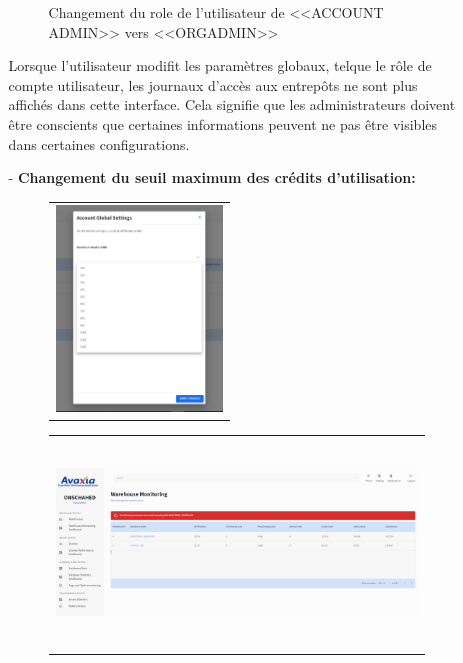 \begin{itemize}
\begin{enumerate}
\begin{figure}[H]
\begin{tabular}[b]{c}
                        \end{tabular}
                        \caption{Changement du role de l'utilisateur de <<ACCOUNT ADMIN>> vers <<ORGADMIN>>                    }
                    \end{figure}
                    \par Lorsque l'utilisateur  modifit les paramètres globaux, telque le rôle de compte utilisateur, les journaux d'accès aux entrepôts ne sont plus affichés dans cette interface. Cela signifie que les administrateurs doivent être conscients que certaines informations peuvent ne pas être visibles dans certaines configurations.
                    \item[-] \textbf{Changement du seuil maximum des crédits d'utilisation:}
                    \begin{figure}[H]
                        \centering
                        \begin{tabular}[b]{c}
                        \includegraphics[width=.2\linewidth, height=5.5cm]{img/captures/warehouse/global_set_credits.png} \\
                        
                        \end{tabular} 
                        \begin{tabular}[b]{c}
                        \includegraphics[width=.7\linewidth, height=5.5cm]{img/captures/warehouse/90.png} \\
                        

\end{tabular}
\end{figure}
\end{enumerate}
\end{itemize}
